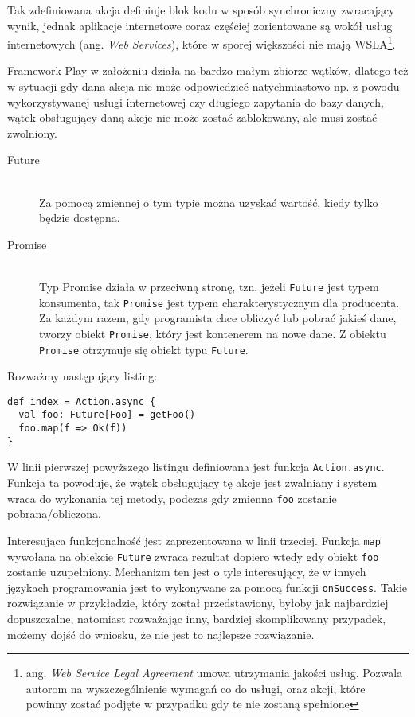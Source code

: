 \par

Tak zdefiniowana akcja definiuje blok kodu w sposób synchroniczny zwracający wynik, jednak aplikacje internetowe coraz częściej zorientowane są wokół usług internetowych (ang. \emph{Web Services}), które w sporej większości nie mają WSLA\footnote{ang. \emph{Web Service Legal Agreement} umowa utrzymania jakości usług. Pozwala autorom na wyszczególnienie wymagań co do usługi, oraz akcji, które powinny zostać podjęte w przypadku gdy te nie zostaną spełnione}.

\par

Framework Play w założeniu działa na bardzo małym zbiorze wątków, dlatego też w sytuacji gdy dana akcja nie może odpowiedzieć natychmiastowo np. z powodu wykorzystywanej usługi internetowej czy długiego zapytania do bazy danych, wątek obsługujący daną akcje nie może zostać zablokowany, ale musi zostać zwolniony.

\begin{description}	
	\item[Future] \hfill \\
		Za pomocą zmiennej o tym typie można uzyskać wartość, kiedy tylko będzie dostępna.
	\item[Promise] \hfill \\
		Typ Promise działa w przeciwną stronę, tzn. jeżeli \lstinline{Future} jest typem konsumenta, tak \lstinline{Promise} jest typem charakterystycznym dla producenta. Za każdym razem, gdy programista chce obliczyć lub pobrać jakieś dane, tworzy obiekt \lstinline{Promise}, który jest kontenerem na nowe dane. Z obiektu \lstinline{Promise} otrzymuje się obiekt typu \lstinline{Future}.
\end{description}

Rozważmy następujący listing:

\begin{lstlisting}
def index = Action.async {
  val foo: Future[Foo] = getFoo()
  foo.map(f => Ok(f))
}
\end{lstlisting}

\par

W linii pierwszej powyższego listingu definiowana jest funkcja \lstinline{Action.async}. Funkcja ta powoduje, że wątek obsługujący tę akcje jest zwalniany i system wraca do wykonania tej metody, podczas gdy zmienna \lstinline{foo} zostanie pobrana/obliczona.

\par
Interesująca funkcjonalność jest zaprezentowana w linii trzeciej. Funkcja \lstinline{map} wywołana na obiekcie \lstinline{Future} zwraca rezultat dopiero wtedy gdy obiekt \lstinline{foo} zostanie uzupełniony. Mechanizm ten jest o tyle interesujący, że w innych językach programowania jest to wykonywane za pomocą funkcji \lstinline{onSuccess}. Takie rozwiązanie w przykładzie, który został przedstawiony, byłoby jak najbardziej dopuszczalne, natomiast rozważając inny, bardziej skomplikowany przypadek, możemy dojść do wniosku, że nie jest to najlepsze rozwiązanie.

